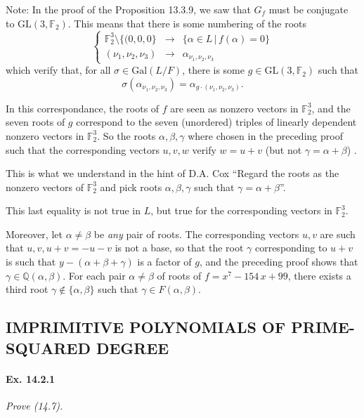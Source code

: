\documentclass[11pt,a4paper]{article}
\newcommand{\Q}{\mathbb{Q}}
\newcommand{\F}{\mathbb{F}}
\newcommand{\Gal}{\mathrm{Gal}}
\begin{document}
Note: In the proof of the Proposition 13.3.9, we saw that $G_f$ must be conjugate to $\mathrm{GL}(3,\F_2)$. This means that there is some numbering of the roots
$$
\left\{
\begin{array}{ccc}
\F_2^3\setminus\{(0,0,0\} & \to &\{\alpha \in L \, |\, f(\alpha) = 0\}\\
(\nu_1,\nu_2,\nu_3) &\to &\alpha_{\nu_1,\nu_2,\nu_3}
\end{array}
\right.
$$
which verify that, for all $\sigma \in\Gal(L/F)$, there is some $g \in \mathrm{GL}(3,\F_2)$ such that
$$\sigma(\alpha_{\nu_1,\nu_2,\nu_3}) = \alpha_{g \cdot (\nu_1,\nu_2,\nu_3)}.$$

In this correspondance, the roots of $f$ are seen as nonzero vectors in $\F_2^3$, and the seven roots of $g$ correspond to the seven (unordered)  triples of  linearly dependent  nonzero vectors in $\F_2^3$. So the roots $\alpha,\beta, \gamma$ where chosen in the preceding proof such that the corresponding vectors $u,v,w$ verify $w= u+v$ (but not $\gamma = \alpha + \beta$) .

This is what we understand in the hint of D.A. Cox ``Regard the roots as the nonzero vectors of $\F_2^3$ and pick roots $\alpha,\beta, \gamma$ such that $\gamma = \alpha+\beta$''.

This last equality is not true in $L$, but true for the corresponding vectors in $\F_2^3$.

Moreover, let $\alpha\ne \beta$ be {\it any} pair of roots. The corresponding vectors $u,v$ are such that $u,v,u+v = -u-v$ is not a base, so that the root $\gamma$ corresponding to $u+v$ is such that $ y - (\alpha+\beta+\gamma)$ is a factor of $g$, and the preceding proof shows that $\gamma \in \Q(\alpha,\beta)$. For each pair $\alpha\ne \beta$ of roots of $f = x^7-154\, x+99$, there exists a third root $\gamma \not \in \{\alpha,\beta\}$ such that $\gamma \in F(\alpha,\beta)$.







\subsection{IMPRIMITIVE POLYNOMIALS OF PRIME-SQUARED DEGREE}
\paragraph{Ex. 14.2.1}

{\it Prove (14.7).
}
\end{document}
